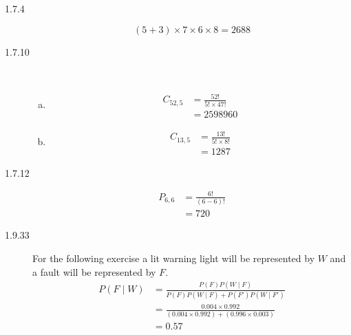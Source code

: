 \documentclass[letterpaper,10pt]{article}
\begin{document}
\begin{description}
\item[1.7.4]
$$(5+3)\times 7\times 6\times8 = 2688$$

\item[1.7.10] \ 
\begin{enumerate}[a)]
\item
\begin{align*}
C_{52,5}  &= \frac{52!}{5!\times 47!} \\
&= 2598960
\end{align*}
\item
\begin{align*}
C_{13,5}  &= \frac{13!}{5!\times 8!} \\
&= 1287
\end{align*}
\end{enumerate}

\item[1.7.12]
\begin{align*}
P_{6,6} &= \frac{6!}{(6-6)!} \\
&= 720
\end{align*}

\item[1.9.33]
For the following exercise a lit warning light will be represented by $W$ and a fault will be represented by $F$.
\begin{align*}
P(F\mid W) &= \frac{P(F) P(W\mid F)}{P(F) P(W\mid F) + P(F') P(W\mid F')} \\
&= \frac{0.004\times 0.992}{(0.004\times 0.992) + (0.996\times 0.003)} \\
&= 0.57
\end{align*}

\end {description}
\end{document}
